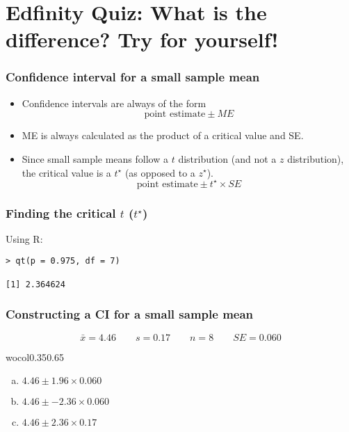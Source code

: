 \documentclass[slidestop,compress,mathserif]{beamer}
\newcommand{\soln}[1]{\textit{#1}}
\begin{document}

\section{Edfinity Quiz: What is the difference? Try for yourself!}



\begin{frame}
\frametitle{Confidence interval for a small sample mean}

\begin{itemize}
\item Confidence intervals are always of the form
\[ \text{point estimate} \pm {ME} \]
\pause
\item ME is always calculated as the product of a critical value and SE.
\pause
\item Since small sample means follow a $t$ distribution (and not a $z$ distribution), the critical value is a $t^\star$ (as opposed to a $z^\star$).
\[ \text{point estimate} \pm t^{\star} \times SE \]
\end{itemize}
\end{frame}



\begin{frame}[fragile]
\frametitle{Finding the critical $t$ ($t^\star$)}

Using R:
\begin{verbatim}
> qt(p = 0.975, df = 7)

[1] 2.364624
\end{verbatim}
\end{frame}



\begin{frame}
\frametitle{Constructing a CI for a small sample mean}

\[ \bar{x} = 4.46 \qquad s = 0.17 \qquad n = 8 \qquad SE = 0.060 \]

	wocol{0.35}{0.65}
{
\begin{enumerate}[(a)]
\item $4.46 \pm 1.96 \times 0.060$
\item $4.46 \pm -2.36 \times 0.060$
\item $4.46 \pm 2.36 \times 0.17$
\end{enumerate}
}
{
\soln{}
\vspace{0.25cm}
}

\end{frame}
\end{document}
